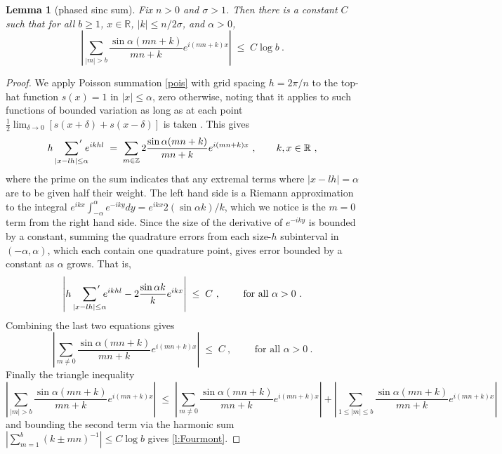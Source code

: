 \documentclass[10pt]{article}
\newcommand{\be}{\begin{equation}}
\newcommand{\ee}{\end{equation}}
\newcommand{\RR}{\mathbb{R}}
\newcommand{\ZZ}{\mathbb{Z}}
\newtheorem{lem}[thm]{Lemma}
\newcommand{\rat}{\sigma}          %
\newcommand{\al}{\alpha}           %
\begin{document}
\begin{lem}[phased sinc sum]  %
  Fix $n>0$ and $\rat>1$.
  Then there is a constant $C$
  such that for all $b\ge 1$,  $x\in\RR$, $|k|\le n/2\sigma$, and $\al>0$,
  \be
  \left|
  \sum_{|m|>b} \frac{\sin \al (mn+k)}{mn+k} e^{i(mn+k)x}
  \right|
  \; \le \; C\log b~.
  \ee
\label{l:Fourmont}
\end{lem}
\begin{proof}
  We apply Poisson summation \eqref{pois}
with grid spacing $h=2\pi/n$ to
  the top-hat function $s(x) = 1$ in $|x|\le \al$, zero otherwise,
  noting that it applies to such functions of bounded variation
  as long as at each
  point $\frac{1}{2}\lim_{\delta\to0} [s(x+\delta) + s(x-\delta)]$ is taken
  \cite[\S 11.22]{apostol}.
  This gives
  $$
  h \sum_{|x-lh|\le \al} \hspace{-2.5ex}{\vphantom{\sum}}'  %
  \;e^{ikhl}  
  \;=\;
  \sum_{m\in\ZZ} 2 \frac{\sin \al (mn+k)}{mn+k} e^{i(mn+k)x}
  ~,\qquad k, x\in\RR~,
  $$
  where the prime on the sum indicates that any extremal terms
  where $|x-lh|=\al$ are to be given half their weight.
  The left hand side is a Riemann approximation to the integral
  $e^{ikx}\int_{-\al}^\al e^{-iky} dy = e^{ikx} 2 (\sin \al k) / k$,
  which we notice is the $m=0$ term from the right hand side.
  Since the size of the derivative of $e^{-iky}$ is bounded by a constant,
  summing the quadrature errors from each size-$h$ subinterval in $(-\al,\al)$,
  which each contain one quadrature point,
  gives error bounded by a constant as $\al$ grows.
  That is,
  $$
  \left | h \sum_{|x-lh|\le \al} \hspace{-2.5ex}{\vphantom{\sum}}'
  \;e^{ikhl} - 2 \frac{\sin \al k}{k} e^{ikx} \right |
  \; \le \; C
  ~, \qquad \mbox{ for all } \al>0~.
  $$
  Combining the last two equations gives
  $$
  \left|
  \sum_{m\neq 0} %
  \frac{\sin \al (mn+k)}{mn+k} e^{i(mn+k)x}
  \right|
  \; \le \; C
  ~, \qquad \mbox{ for all } \al>0~.
  $$
  Finally the triangle inequality
  $$
  \left|
  \sum_{|m|> b} \frac{\sin \al (mn+k)}{mn+k} e^{i(mn+k)x}
  \right|
  \; \le \; 
  \left|
  \sum_{m\neq 0} \frac{\sin \al (mn+k)}{mn+k} e^{i(mn+k)x}
  \right|
+
    \left|
  \sum_{1\le|m|\le b} \frac{\sin \al (mn+k)}{mn+k} e^{i(mn+k)x}
  \right|
  $$
  and bounding the second term via the harmonic sum
  $|\sum_{m=1}^b (k\pm mn)^{-1}| \le C \log b$ gives \eqref{l:Fourmont}.
\end{proof}
\end{document}
